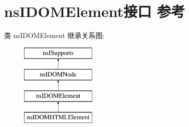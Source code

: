 \hypertarget{interfacens_i_d_o_m_element}{}\section{ns\+I\+D\+O\+M\+Element接口 参考}
\label{interfacens_i_d_o_m_element}
类 ns\+I\+D\+O\+M\+Element 继承关系图\+:\begin{figure}[H]
\begin{center}
\leavevmode
\includegraphics[height=4.000000cm]{interfacens_i_d_o_m_element}
\end{center}
\end{figure}
